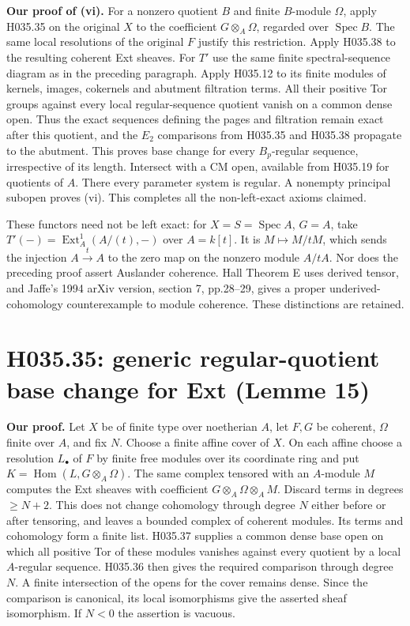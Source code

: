 \textbf{Our proof of (vi).} For a nonzero quotient $B$ and finite
$B$-module $\Omega$, apply H035.35 on the original $X$ to the
coefficient $G\otimes_A\Omega$, regarded over $\operatorname{Spec}B$.
The same local resolutions of the original $F$ justify this restriction.
Apply H035.38 to the resulting coherent Ext sheaves. For $T'$ use
the same finite spectral-sequence diagram as in the preceding
paragraph. Apply H035.12 to its finite modules of kernels, images,
cokernels and abutment filtration terms. All their positive Tor
groups against every local regular-sequence quotient vanish on a
common dense open. Thus the exact sequences defining the pages and
filtration remain exact after this quotient, and the $E_2$
comparisons from H035.35 and H035.38 propagate to the abutment.
This proves base change for every $B_p$-regular sequence, irrespective
of its length. Intersect with
a CM open, available from H035.19 for quotients of $A$. There
every parameter system is regular. A nonempty principal subopen
proves (vi). This completes all the non-left-exact axioms claimed.

These functors need not be left exact: for $X=S=\operatorname{Spec}A$,
$G=A$, take $T'(-)=\operatorname{Ext}^1_A(A/(t),-)$ over
$A=k[t]$. It is $M\mapsto M/tM$, which sends the injection
$A\xrightarrow{t}A$ to the zero map on the nonzero module $A/tA$.
Nor does the preceding proof assert Auslander coherence. Hall
Theorem E uses derived tensor, and Jaffe's 1994 arXiv version,
section 7, pp.28--29, gives a proper underived-cohomology
counterexample to module coherence. These distinctions are retained.

\section{H035.35: generic regular-quotient base change for Ext (Lemme 15)}
\textbf{Our proof.} Let $X$ be of finite type over noetherian $A$,
let $F,G$ be coherent, $\Omega$ finite over $A$, and fix $N$.
Choose a finite affine cover of $X$. On each affine choose a
resolution $L_\bullet$ of $F$ by finite free modules over its
coordinate ring and put $K=\operatorname{Hom}(L,G\otimes_A\Omega)$.
The same complex tensored with an $A$-module $M$ computes the
Ext sheaves with coefficient $G\otimes_A\Omega\otimes_A M$.
Discard terms in degrees $\geq N+2$. This does not change
cohomology through degree $N$ either before or after tensoring,
and leaves a bounded complex of coherent modules. Its terms and
cohomology form a finite list. H035.37 supplies a common dense
base open on which all positive Tor of these modules vanishes
against every quotient by a local $A$-regular sequence. H035.36
then gives the required comparison through degree $N$. A finite
intersection of the opens for the cover remains dense. Since the
comparison is canonical, its local isomorphisms give the asserted
sheaf isomorphism. If $N<0$ the assertion is vacuous.

